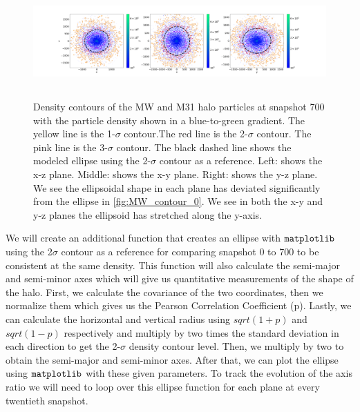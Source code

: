 \documentclass[linenumbers, twocolumn]{aastex631}
\begin{document}
\begin{figure}
    \centering
    \includegraphics[width=\textwidth,height=4.3cm]{figures/MW_M31_700_3subplots_Density.png}
    \caption{Density contours of the MW and M31 halo particles at snapshot 700 with the particle density shown in a blue-to-green gradient. The yellow line is the 1-$\sigma$ contour.The red line is the 2-$\sigma$ contour. The pink line is the 3-$\sigma$ contour. The black dashed line shows the modeled ellipse using the 2-$\sigma$ contour as a reference. Left: shows the x-z plane. Middle: shows the x-y plane. Right: shows the y-z plane. We see the ellipsoidal shape in each plane has deviated significantly from the ellipse in \ref{fig:MW_contour_0}. We see in both the x-y and y-z planes the ellipsoid has stretched along the y-axis.}
    \label{fig:MW_M31_contour_700}
\end{figure}

We will create an additional function that creates an ellipse with $\tt{matplotlib}$ using the 2$\sigma$ contour as a reference for comparing snapshot 0 to 700 to be consistent at the same density. This function will also calculate the semi-major and semi-minor axes which will give us quantitative measurements of the shape of the halo. First, we calculate the covariance of the two coordinates, then we normalize them which gives us the Pearson Correlation Coefficient (p). Lastly, we can calculate the horizontal and vertical radius using $sqrt(1+p)$ and $sqrt(1-p)$ respectively and multiply by two times the standard deviation in each direction to get the 2-$\sigma$ density contour level. Then, we multiply by two to obtain the semi-major and semi-minor axes. After that, we can plot the ellipse using $\tt{matplotlib}$ with these given parameters.
To track the evolution of the axis ratio we will need to loop over this ellipse function for each plane at every twentieth snapshot.
\end{document}
